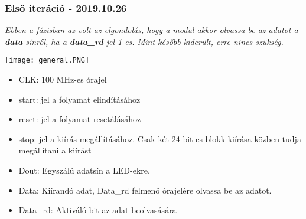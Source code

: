 \subsubsection{Első iteráció - 2019.10.26}

\tab \textit{Ebben a fázisban az volt az elgondolás, hogy a modul akkor olvassa be az adatot a \textbf{data} sínről, ha a \textbf{data\_rd} jel 1-es. Mint később kiderült,
erre nincs szükség.}

\texttt{[image: general.PNG]}

\begin{itemize}
\item CLK: 100 MHz-es órajel
\item start: jel a folyamat elindításához
\item reset: jel a folyamat resetálásához
\item stop: jel a kiírás megállításához. Csak két 24 bit-es blokk kiírása közben tudja megállítani a kiírást
\item Dout: Egyszálú adatsín a LED-ekre.
\item Data: Kiírandó adat, Data\_rd felmenő órajelére olvassa be az adatot.
\item Data\_rd: Aktiváló bit az adat beolvasására
\end{itemize}